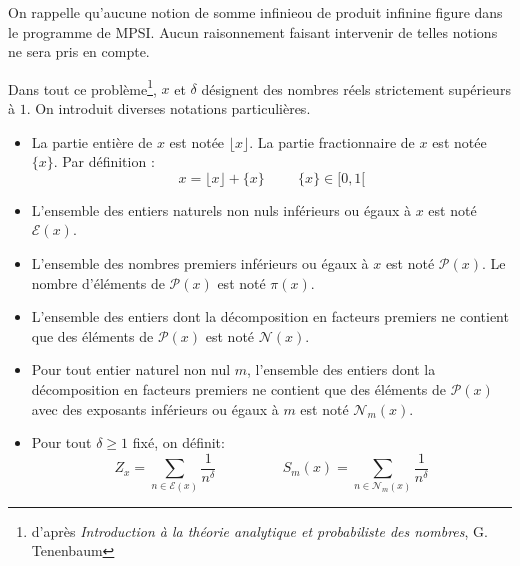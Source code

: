 On rappelle qu'aucune notion de \og somme infinie\fg \phantom{n}ou de \og produit infini\fg \phantom{n}ne figure dans le programme de MPSI. Aucun raisonnement faisant intervenir de telles notions ne sera pris en compte.

Dans tout ce problème\footnote{d'après \emph{Introduction à la théorie analytique et probabiliste des nombres}, G. Tenenbaum}, $x$ et $\delta$ désignent des  nombres réels strictement supérieurs à $1$. On introduit diverses notations particulières.
\begin{itemize}
\item La partie entière de $x$ est notée $\lfloor x \rfloor$. La partie fractionnaire de $x$ est notée $\{x\}$. Par définition :
\begin{displaymath}
 x = \lfloor x \rfloor + \{x\}\hspace{1cm} \{x\}\in [0,1[ 
\end{displaymath}

\item L'ensemble des entiers naturels non nuls inférieurs ou égaux à $x$ est noté $\mathcal E(x)$.
 \item L'ensemble des nombres premiers inférieurs ou égaux à $x$ est noté $\mathcal P(x)$. Le nombre d'éléments de $\mathcal P(x)$ est noté $\pi(x)$.
\item L'ensemble des entiers dont la décomposition en facteurs premiers ne contient que des éléments de $\mathcal P(x)$ est noté $\mathcal N(x)$.
\item Pour tout entier naturel non nul $m$, l'ensemble des entiers dont la décomposition en facteurs premiers ne contient que des éléments de $\mathcal P(x)$ avec des exposants inférieurs ou égaux à $m$ est noté $\mathcal N_m(x)$.
\item Pour tout $\delta\geq1$ fixé, on définit:
\begin{displaymath}
 Z_x=\sum_{n\in \mathcal E(x)}\frac{1}{n^\delta}\hspace{1cm} \hspace{1cm}
 S_m(x) = \sum_{n\in \mathcal N_m(x)}\frac{1}{n^\delta}
\end{displaymath}
\end{itemize}
